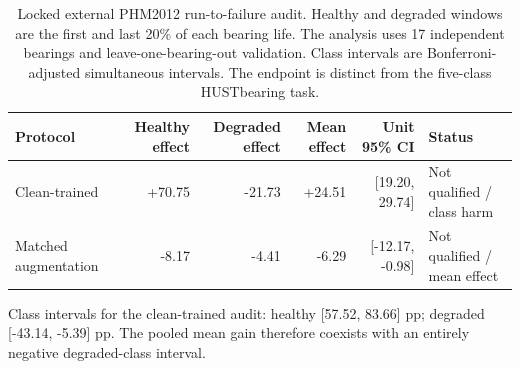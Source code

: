 \begin{table}[t]
\centering
\caption{Locked external PHM2012 run-to-failure audit. Healthy and degraded
windows are the first and last 20\% of each bearing life. The analysis uses 17
independent bearings and leave-one-bearing-out validation. Class intervals are
Bonferroni-adjusted simultaneous intervals. The endpoint is distinct from the
five-class HUSTbearing task.}
\label{tab:phm2012-external}
\footnotesize
\begin{tabular}{@{}lrrrrl@{}}
\toprule
Protocol & Healthy effect & Degraded effect & Mean effect & Unit 95\% CI & Status \\
\midrule
Clean-trained & +70.75 & -21.73 & +24.51 & [19.20, 29.74] & Not qualified / class harm \\
Matched augmentation & -8.17 & -4.41 & -6.29 & [-12.17, -0.98] & Not qualified / mean effect \\
\bottomrule
\end{tabular}
\par\smallskip
\parbox{\linewidth}{\footnotesize Class intervals for the clean-trained audit:
healthy [57.52, 83.66] pp; degraded [-43.14, -5.39] pp. The pooled mean gain
therefore coexists with an entirely negative degraded-class interval.}
\end{table}

